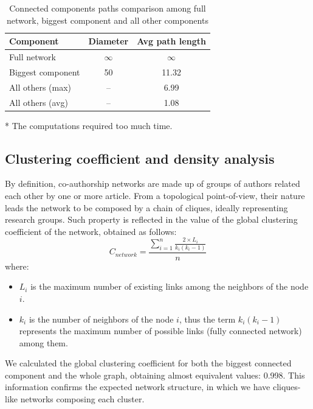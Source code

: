 \documentclass[sigchi]{acmart}
\begin{document}
\begin{table}
  \caption{Connected components paths comparison among full network, biggest component and all other components}
  \label{tab:connected_components_paths}
  \begin{tabular}{lcc}
    \toprule
    Component & Diameter & Avg path length\\
    \midrule
    Full network    & $\infty$ & $\infty$\\
    Biggest component & 50  & 11.32\\
    All others (max) & --\tnote{*}    & 6.99 \\
    All others (avg) & --\tnote{*}    & 1.08 \\
  \bottomrule
\end{tabular}
\begin{tablenotes}
\begin{flushleft}
  \item[*] The computations required too much time.
\end{flushleft}
  \end{tablenotes}
\end{table}

\subsection{Clustering coefficient and density analysis}
By definition, co-authorship networks are made up of groups of authors related each other by one or more article. From a topological point-of-view, their nature leads the network to be composed by a chain of cliques, ideally representing research groups. Such property is reflected in the value of the global clustering coefficient of the network, obtained as follows:
$$ C_{network} = \frac{\sum_{i=1}^{n} \frac{2\times L_{i}}{ k_i(k_i-1)}}{n}$$
where:
\begin{itemize}
    \item $L_i$ is the maximum number of existing links among the neighbors of the node $i$.
    \item $k_i$ is the number of neighbors of the node $i$, thus the term $k_i(k_i -1)$ represents the maximum number of possible links (fully connected network) among them. 
\end{itemize}
We calculated the global clustering coefficient for both the biggest connected component and the whole graph, obtaining almost equivalent values: 0.998. This information confirms the expected network structure, in which we have cliques-like networks composing each cluster.
\end{document}

